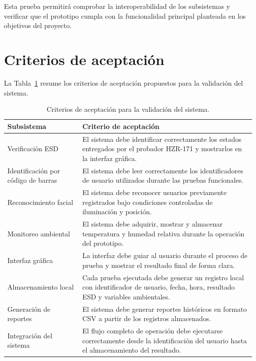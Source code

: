 Esta prueba permitirá comprobar la interoperabilidad de los subsistemas y verificar que el
prototipo cumpla con la funcionalidad principal planteada en los objetivos del proyecto.

\section{Criterios de aceptación}

La Tabla~\ref{tab:criterios_validacion} resume los criterios de aceptación propuestos para
la validación del sistema.

\begin{table}[H]
\centering
\caption{Criterios de aceptación para la validación del sistema.}
\label{tab:criterios_validacion}
\begin{tabularx}{\textwidth}{p{4.2cm} X}
\toprule
\textbf{Subsistema} & \textbf{Criterio de aceptación} \\
\midrule
Verificación ESD &
El sistema debe identificar correctamente los estados entregados por el probador HZR-171
y mostrarlos en la interfaz gráfica. \\

Identificación por código de barras &
El sistema debe leer correctamente los identificadores de usuario utilizados durante las
pruebas funcionales. \\

Reconocimiento facial &
El sistema debe reconocer usuarios previamente registrados bajo condiciones controladas
de iluminación y posición. \\

Monitoreo ambiental &
El sistema debe adquirir, mostrar y almacenar temperatura y humedad relativa durante la
operación del prototipo. \\

Interfaz gráfica &
La interfaz debe guiar al usuario durante el proceso de prueba y mostrar el resultado final
de forma clara. \\

Almacenamiento local &
Cada prueba ejecutada debe generar un registro local con identificador de usuario, fecha,
hora, resultado ESD y variables ambientales. \\

Generación de reportes &
El sistema debe generar reportes históricos en formato CSV a partir de los registros
almacenados. \\

Integración del sistema &
El flujo completo de operación debe ejecutarse correctamente desde la identificación del
usuario hasta el almacenamiento del resultado. \\
\bottomrule
\end{tabularx}
\end{table}

